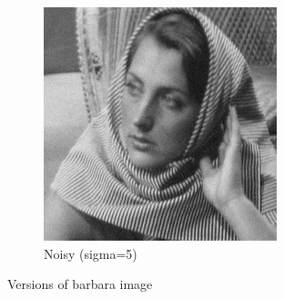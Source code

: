 \documentclass[12pt]{article}
\begin{document}
\begin{figure}[h]
\begin{subfigure}[b]{0.3\textwidth}
        \includegraphics[width=\textwidth]{../images/noisy_barbara256.png}
        \caption{Noisy (sigma=5)}
        \label{fig:subfig2}
    \end{subfigure}
    \caption{Versions of barbara image}
    \label{fig:overall}
\end{figure}
\end{document}
